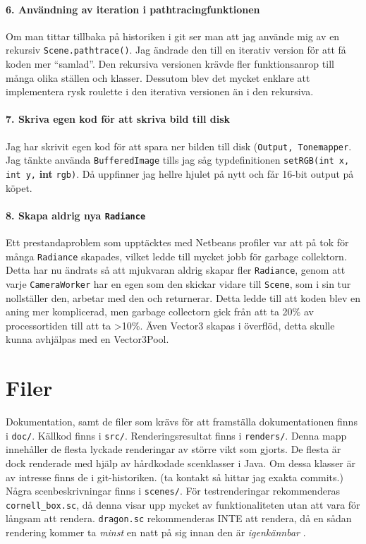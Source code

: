 \documentclass{article}
\begin{document}
\paragraph{6. Användning av iteration i pathtracingfunktionen}
Om man tittar tillbaka på historiken i git ser man att jag använde mig
av en rekursiv \texttt{Scene.pathtrace()}. Jag ändrade den till en
iterativ version för att få koden mer ``samlad''. Den rekursiva
versionen krävde fler funktionsanrop till många olika ställen och
klasser. Dessutom blev det mycket enklare att implementera rysk
roulette i den iterativa versionen än i den rekursiva.

\paragraph{7. Skriva egen kod för att skriva bild till disk}
Jag har skrivit egen kod för att spara ner bilden till disk
(\texttt{Output, Tonemapper}. Jag tänkte använda
\texttt{BufferedImage} tills jag såg typdefinitionen
\texttt{setRGB(int x, int y,} \textbf{int} \texttt{rgb)}. Då uppfinner
jag hellre hjulet på nytt och får 16-bit output på köpet.

\paragraph{8. Skapa aldrig nya \texttt{Radiance}}
Ett prestandaproblem som upptäcktes med Netbeans profiler var att på
tok för många \texttt{Radiance} skapades, vilket ledde till mycket
jobb för garbage collektorn. Detta har nu ändrats så att mjukvaran
aldrig skapar fler \texttt{Radiance}, genom att varje
\texttt{CameraWorker} har en egen som den skickar vidare till
\texttt{Scene}, som i sin tur nollställer den, arbetar med den och
returnerar. Detta ledde till att koden blev en aning mer komplicerad,
men garbage collectorn gick från att ta 20\% av processortiden till
att ta >10\%. Även Vector3 skapas i överflöd, detta skulle kunna
avhjälpas med en Vector3Pool.


\section{Filer}
Dokumentation, samt de filer som krävs för att framställa
dokumentationen finns i \texttt{doc/}. Källkod finns i
\texttt{src/}. Renderingsresultat finns i \texttt{renders/}. Denna
mapp innehåller de flesta lyckade renderingar av större vikt som
gjorts. De flesta är dock renderade med hjälp av hårdkodade
scenklasser i Java. Om dessa klasser är av intresse finns de i
git-historiken. (ta kontakt så hittar jag exakta commits.) Några
scenbeskrivningar finns i \texttt{scenes/}. För testrenderingar
rekommenderas \texttt{cornell\_box.sc}, då denna visar upp mycket av
funktionaliteten utan att vara för långsam att
rendera. \texttt{dragon.sc} rekommenderas INTE att rendera, då en
sådan rendering kommer ta \emph{minst} en natt på sig innan den är
\emph{ igenkännbar }.
\end{document}
